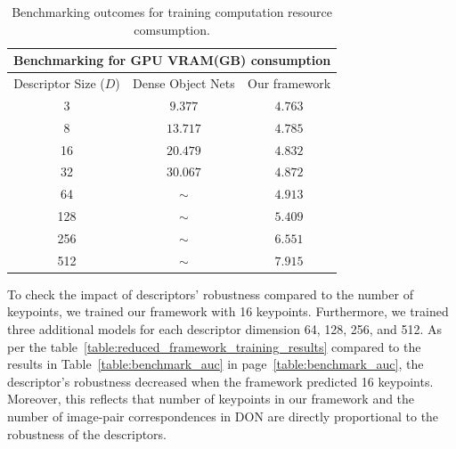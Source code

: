 \begin{table}[htb]
    \caption{Benchmarking outcomes for training computation resource comsumption.}
    \label{table:benchmark_gpu}
    \centering
    \begin{tabular}{ccc}
        \toprule
        \multicolumn{3}{c}{Benchmarking for GPU VRAM(GB) consumption} \\
        \midrule
        Descriptor Size ($D$) & Dense Object Nets & Our framework     \\ \hline
        3                     & $9.377$           & $\mathbf{4.763}$  \\
        8                     & $13.717$          & $\mathbf{4.785} $ \\
        16                    & $20.479$          & $\mathbf{4.832} $ \\
        32                    & $30.067$          & $\mathbf{4.872} $ \\
        64                    & $ \mathtt{\sim}$  & $4.913$           \\
        128                   & $ \mathtt{\sim}$  & $5.409 $          \\
        256                   & $ \mathtt{\sim}$  & $6.551 $          \\
        512                   & $ \mathtt{\sim}$  & $7.915 $          \\
        \bottomrule
    \end{tabular}
\end{table}

To check the impact of descriptors' robustness compared to the number of keypoints, we trained our framework with 16 keypoints.
Furthermore, we trained three additional models for each descriptor dimension 64, 128, 256, and 512.
As per the table~\ref{table:reduced_framework_training_results} compared to the results in Table~\ref{table:benchmark_auc} in page~\ref{table:benchmark_auc},
the descriptor's robustness decreased when the framework predicted 16 keypoints.
Moreover, this reflects that number of keypoints in our framework and the number of image-pair correspondences in DON are directly proportional to the robustness of the descriptors.


